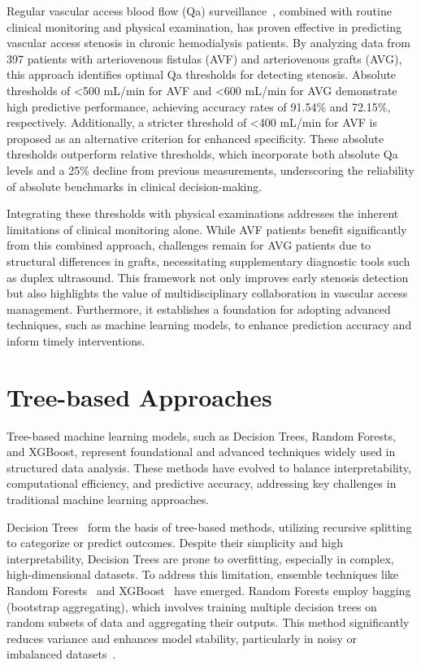 Regular vascular access blood flow (Qa) surveillance~\cite{Wu}, combined with routine clinical monitoring and physical examination, has proven effective in predicting vascular access stenosis in chronic hemodialysis patients. By analyzing data from 397 patients with arteriovenous fistulas (AVF) and arteriovenous grafts (AVG), this approach identifies optimal Qa thresholds for detecting stenosis. Absolute thresholds of <500 mL/min for AVF and <600 mL/min for AVG demonstrate high predictive performance, achieving accuracy rates of 91.54\% and 72.15\%, respectively. Additionally, a stricter threshold of <400 mL/min for AVF is proposed as an alternative criterion for enhanced specificity. These absolute thresholds outperform relative thresholds, which incorporate both absolute Qa levels and a 25\% decline from previous measurements, underscoring the reliability of absolute benchmarks in clinical decision-making.

Integrating these thresholds with physical examinations addresses the inherent limitations of clinical monitoring alone. While AVF patients benefit significantly from this combined approach, challenges remain for AVG patients due to structural differences in grafts, necessitating supplementary diagnostic tools such as duplex ultrasound. This framework not only improves early stenosis detection but also highlights the value of multidisciplinary collaboration in vascular access management. Furthermore, it establishes a foundation for adopting advanced techniques, such as machine learning models, to enhance prediction accuracy and inform timely interventions.
\newpage
\section{Tree-based Approaches}

Tree-based machine learning models, such as Decision Trees, Random Forests, and XGBoost, represent foundational and advanced techniques widely used in structured data analysis. These methods have evolved to balance interpretability, computational efficiency, and predictive accuracy, addressing key challenges in traditional machine learning approaches.

Decision Trees~\cite{decision_tree} form the basis of tree-based methods, utilizing recursive splitting to categorize or predict outcomes. Despite their simplicity and high interpretability, Decision Trees are prone to overfitting, especially in complex, high-dimensional datasets. To address this limitation, ensemble techniques like Random Forests~\cite{random_forest} and XGBoost~\cite{XGBoost} have emerged. Random Forests employ bagging (bootstrap aggregating), which involves training multiple decision trees on random subsets of data and aggregating their outputs. This method significantly reduces variance and enhances model stability, particularly in noisy or imbalanced datasets~\cite{comprehensive_tree_based_model}.

